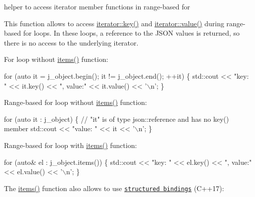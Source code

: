 helper to access iterator member functions in range-\/based for 

This function allows to access \hyperlink{classnlohmann_1_1detail_1_1iter__impl_ad14ac9338131d0be2c6bb41c715c2b27}{iterator\+::key()} and \hyperlink{classnlohmann_1_1detail_1_1iter__impl_adc4048d25e057ce8ec0b912642c24731}{iterator\+::value()} during range-\/based for loops. In these loops, a reference to the J\+S\+ON values is returned, so there is no access to the underlying iterator.

For loop without {\ttfamily \hyperlink{classnlohmann_1_1basic__json_a916a6ba75ec7624e9c6c977a52d6fd17}{items()}} function\+:


\begin{DoxyCode}
\textcolor{keywordflow}{for} (\textcolor{keyword}{auto} it = j\_object.begin(); it != j\_object.end(); ++it)
\{
    std::cout << \textcolor{stringliteral}{"key: "} << it.key() << \textcolor{stringliteral}{", value:"} << it.value() << \textcolor{charliteral}{'\(\backslash\)n'};
\}
\end{DoxyCode}


Range-\/based for loop without {\ttfamily \hyperlink{classnlohmann_1_1basic__json_a916a6ba75ec7624e9c6c977a52d6fd17}{items()}} function\+:


\begin{DoxyCode}
\textcolor{keywordflow}{for} (\textcolor{keyword}{auto} it : j\_object)
\{
    \textcolor{comment}{// "it" is of type json::reference and has no key() member}
    std::cout << \textcolor{stringliteral}{"value: "} << it << \textcolor{charliteral}{'\(\backslash\)n'};
\}
\end{DoxyCode}


Range-\/based for loop with {\ttfamily \hyperlink{classnlohmann_1_1basic__json_a916a6ba75ec7624e9c6c977a52d6fd17}{items()}} function\+:


\begin{DoxyCode}
\textcolor{keywordflow}{for} (\textcolor{keyword}{auto}& el : j\_object.items())
\{
    std::cout << \textcolor{stringliteral}{"key: "} << el.key() << \textcolor{stringliteral}{", value:"} << el.value() << \textcolor{charliteral}{'\(\backslash\)n'};
\}
\end{DoxyCode}


The {\ttfamily \hyperlink{classnlohmann_1_1basic__json_a916a6ba75ec7624e9c6c977a52d6fd17}{items()}} function also allows to use \href{https://en.cppreference.com/w/cpp/language/structured_binding}{\tt structured bindings} (C++17)\+:


